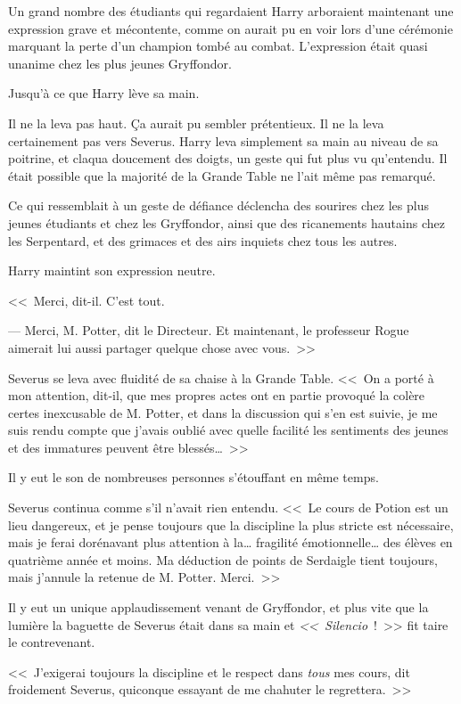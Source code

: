 Un grand nombre des étudiants qui regardaient Harry arboraient maintenant une expression grave et mécontente, comme on aurait pu en voir lors d'une cérémonie marquant la perte d'un champion tombé au combat. L'expression était quasi unanime chez les plus jeunes Gryffondor.

Jusqu'à ce que Harry lève sa main.

Il ne la leva pas haut. Ça aurait pu sembler prétentieux. Il ne la leva certainement pas vers Severus. Harry leva simplement sa main au niveau de sa poitrine, et claqua doucement des doigts, un geste qui fut plus vu qu'entendu. Il était possible que la majorité de la Grande Table ne l'ait même pas remarqué.

Ce qui ressemblait à un geste de défiance déclencha des sourires chez les plus jeunes étudiants et chez les Gryffondor, ainsi que des ricanements hautains chez les Serpentard, et des grimaces et des airs inquiets chez tous les autres.

Harry maintint son expression neutre.

<<~Merci, dit-il. C'est tout.

--- Merci, M. Potter, dit le Directeur. Et maintenant, le professeur Rogue aimerait lui aussi partager quelque chose avec vous.~>>

Severus se leva avec fluidité de sa chaise à la Grande Table. <<~On a porté à mon attention, dit-il, que mes propres actes ont en partie provoqué la colère certes inexcusable de M. Potter, et dans la discussion qui s'en est suivie, je me suis rendu compte que j'avais oublié avec quelle facilité les sentiments des jeunes et des immatures peuvent être blessés…~>>

Il y eut le son de nombreuses personnes s'étouffant en même temps.

Severus continua comme s'il n'avait rien entendu. <<~Le cours de Potion est un lieu dangereux, et je pense toujours que la discipline la plus stricte est nécessaire, mais je ferai dorénavant plus attention à la… fragilité émotionnelle… des élèves en quatrième année et moins. Ma déduction de points de Serdaigle tient toujours, mais j'annule la retenue de M. Potter. Merci.~>>

Il y eut un unique applaudissement venant de Gryffondor, et plus vite que la lumière la baguette de Severus était dans sa main et \emph{<<~Silencio}~!~>> fit taire le contrevenant.

<<~J'exigerai toujours la discipline et le respect dans \emph{tous} mes cours, dit froidement Severus, quiconque essayant de me chahuter le regrettera.~>>

